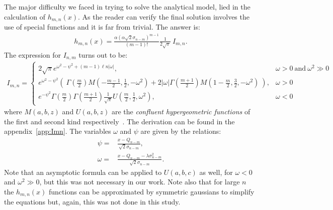 \documentclass[a4paper,11pt]{article}
\begin{document}
The major difficulty we faced in trying to solve the analytical model, lied in the calculation of $h_{m,n}(x)$. 
As the reader can verify the final solution involves the use of special functions and it is far from trivial. 
The answer is:
\begin{align}
h_{m,n}(x) =  \frac{\alpha (\alpha\sqrt{2} \sigma_{n-m})^{m-1}}{(m-1)!} \frac{1}{2\sqrt{\pi}} \  I_{m,n}.
\end{align}  
The expression for $I_{n,m}$ turns out to be:
\begin{align}
I_{m,n} = 
\begin{cases}
2\sqrt{\pi}   e^{\omega^2 - \psi^2 + (m-1) \ell n |\omega|},  & \omega>0 \ \text{and} \  \omega^2 \gg 0\\
e^{\omega^2 -\psi^2 } \left(\  \Gamma\left( \frac{m}{2} \right) M\left(-\frac{m-1}{2}, \frac{1}{2}, -\omega^2 \right)  
+ 2|\omega| \Gamma\left( \frac{m+1}{2} \right) M\left(1-\frac{m}{2}, \frac{3}{2}, -\omega^2 \right)   \    \right), &  \omega > 0  \\
e^{ -\psi^2 } \Gamma\left( \frac{m}{2} \right)   \Gamma\left( \frac{m+1}{2} \right) \frac{1}{\sqrt{\pi}} U\left( \frac{m}{2}, \frac{1}{2}, \omega^2  \right), & \omega<0
\end{cases}
\nonumber
\end{align} 
where $M(a,b,z)$ and $U(a,b,z)$ are the \emph{confluent hypergeometric functions} of the first and second kind respectively~\cite{error}. 
The derivation can be found in the appendix~\ref{app:Imn}. 
The variables $\omega$ and $\psi$ are given by the relations:
\begin{align}
\psi = & \frac{x-Q_{n-m}}{\sqrt{2}\sigma_{n-m}}, \\
\omega = & \frac{x-Q_{n-m} -\lambda\sigma^2_{n-m}}{\sqrt{2}\sigma_{n-m}}.
\end{align}  
Note that an asymptotic formula can be applied to $U(a,b,c)$ as well, for $\omega < 0$ and $\omega^2 \gg 0$, but this was not necessary in our work. 
Note also that for large $n$ the $h_{m,n}(x)$ functions can be approximated by symmetric gaussians to simplify the equations but, again, this was not done in this study. 
\end{document}
